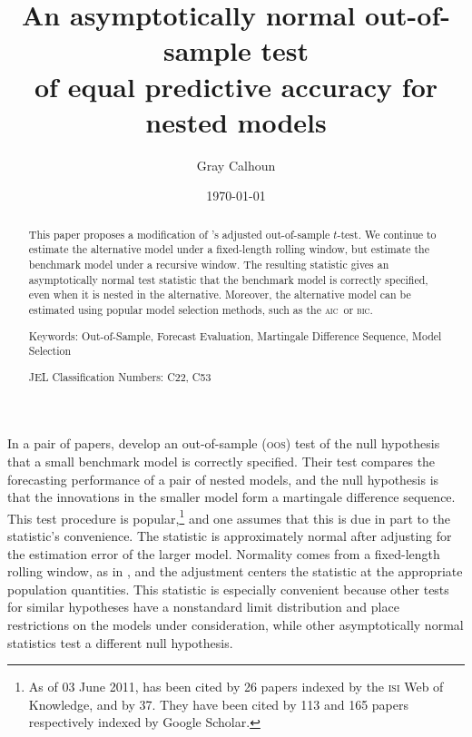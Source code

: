 \documentclass[12pt]{article}
\newcommand\possessivecite[1]{\citeauthor{#1}'s \citeyearpar{#1}}
\newcommand{\aic}{\textsc{aic}}
\newcommand{\bic}{\textsc{bic}}
\newcommand{\oos}{\textsc{oos}}
\begin{document}
\author{Gray Calhoun} \title{An asymptotically normal out-of-sample
  test\\ of equal predictive accuracy for nested models} 
\date{\today}
\maketitle

\begin{abstract} 
  \noindent This paper proposes a modification of
  \possessivecite{ClW:07} adjusted out-of-sample $t$-test. We continue
  to estimate the alternative model under a fixed-length rolling
  window, but estimate the benchmark model under a recursive
  window. The resulting statistic gives an asymptotically normal test
  statistic that the benchmark model is correctly specified, even when
  it is nested in the alternative.  Moreover, the alternative model
  can be estimated using popular model selection methods, such as the
  \aic\ or \bic.

\strut

\noindent Keywords: Out-of-Sample, Forecast Evaluation, Martingale
Difference Sequence, Model Selection

\strut

\noindent JEL Classification Numbers: C22, C53

\end{abstract}

\newpage \noindent In a pair of papers, \citet{ClW:06,ClW:07} develop
an out-of-sample (\oos) test of the null hypothesis that a small
benchmark model is correctly specified.  Their test compares the
forecasting performance of a pair of nested models, and the null
hypothesis is that the innovations in the smaller model form a
martingale difference sequence.  This test procedure is
popular,\footnote{As of 03 June 2011, \citet{ClW:06} has been cited by
  26 papers indexed by the \textsc{isi} Web of Knowledge, and
  \citet{ClW:07} by 37. They have been cited by 113 and 165 papers
  respectively indexed by Google Scholar.} and one assumes that this
is due in part to the statistic's convenience.  The statistic is
approximately normal after adjusting for the estimation error of the
larger model.  Normality comes from a fixed-length rolling window, as
in \citet{GiW:06}, and the adjustment centers the statistic at the
appropriate population quantities.  This statistic is especially
convenient because other tests for similar hypotheses \citep[among
others]{Mcc:07,ClM:05,ClM:01,CoS:04,CoS:02,CCS:01} have a nonstandard
limit distribution and place restrictions on the models under
consideration, while other asymptotically normal statistics
\citep{GiW:06} test a different null hypothesis.
\end{document}
